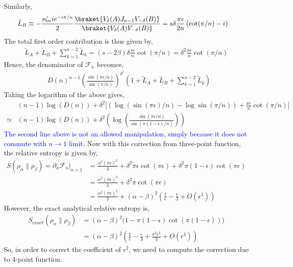 \documentclass[11pt]{article}
\newcommand{\ep}{\epsilon}
\newcommand{\p}{\partial}
\newcommand{\nn}{\nonumber}
\newcommand{\lb}{\left(}
\newcommand{\rb}{\right)}
\newcommand{\NL}[1]{\textcolor{blue}{#1}}
\begin{document}
Similarly,
\begin{align}
    \tilde{L}_B &\equiv -\frac{s\zeta_ni e^{-i\pi/n}}{2}\frac{\braket{V_\delta(A)J_{n-1}V_{-\delta}(B)}}{\braket{V_{\delta}(A)V_{-\delta}(B)}} = s\delta\frac{\pi \ep}{2n}\lb\cot(\pi/n) -i\rb
\end{align}
The total first order contribution is thus given by,
\begin{align}
    \tilde{L}_A + \tilde{L}_B + \sum_{k=1}^{n-2}\tilde{L}_k = (s-2\beta)\delta \frac{\pi \ep}{n}\cot(\pi/n) = \delta^2 \frac{\pi \ep}{n}\cot(\pi/n)
\end{align}
Hence, the denominator of $\mathcal{F}_n$ becomes,
\begin{align}
   &D(n)^{n-1} \lb \frac{\sin (\pi \ep/n)}{\sin(\pi/n)}\rb^{\delta^2} \lb 1+ \tilde{L}_A + \tilde{L}_B + \sum_{k=1}^{n-2}\tilde{L}_k \rb
\end{align}
Taking the logarithm of the above gives,
\begin{align}
    &(n-1)\log(D(n)) + \delta^2 \Bigg[ \lb \log (\sin (\pi \ep)/n) -  \log\sin(\pi/n)\rb + \frac{\pi \ep}{n} \cot(\pi /n) 
    \Bigg] \\
    \simeq &(n-1)\log(D(n)) + \delta^2 \lb \log \lb\frac{\sin(\pi\ep/n)}{\sin(\pi (1-\ep)/n)}\rb \rb
\end{align}
\NL{The second line above is not an allowed manipulation, simply because it does not commute with $n\to 1$ limit.}
Now with this correction from three-point function, the relative entropy is given by, 
\begin{align}
    S(\rho_\alpha \| \rho_\beta) = \p_n \mathcal{F}_n|_{n=1} &= \frac{\alpha ^2 \lb \pi \ep \rb^2 }{3} + \delta^2 \pi \ep \cot(\pi \ep) + \delta^2 \pi (1-\ep) \cot (\pi \ep) \\
    &= \frac{\alpha ^2 \lb \pi \ep \rb^2 }{3} + \delta^2 \pi \cot(\pi \ep)\nn\\
    &= \frac{\alpha^2 (\pi \ep)^2}{3} + (\alpha - \beta)^2 \lb\frac{1}{\ep} - \frac{\ep}{3} + O(\ep^3)\rb
\end{align}
However, the exact analytical relative entropy is,
\begin{align}
    S_{exact}(\rho_\alpha \| \rho_\beta) &= (\alpha - \beta)^2 \Big(1- \pi (1-\ep)\cot(\pi (1-\ep))\Big) \\
    &= (\alpha - \beta)^2 \lb \frac{1}{\ep} - \frac{\ep}{3} + \frac{\pi ^2 \ep^2}{3} + O(\ep^3)\rb
\end{align}
So, in order to correct the coefficient of $\ep^2$, we need to compute the correction due to 4-point function. 
\end{document}
